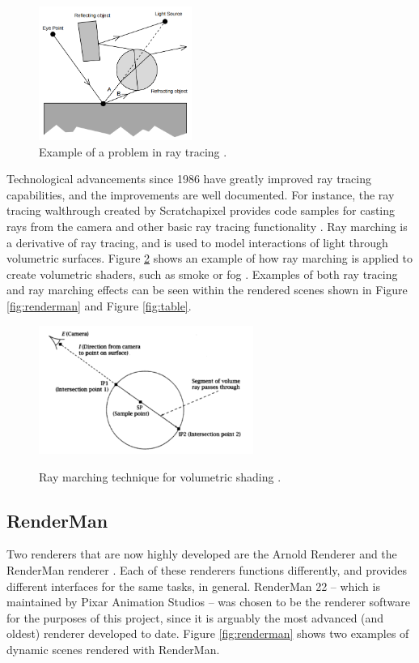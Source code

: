 \documentclass[conference]{IEEEtran}
\begin{document}
\begin{figure}[htbp]
\centerline{\includegraphics[width=5cm]{raytrace.png}}
\caption{Example of a problem in ray tracing \cite{backwards_raytrace}.}
\label{fig:raytrace}
\end{figure}

Technological advancements since 1986 have greatly improved ray tracing capabilities,
and the improvements are well documented.
For instance, the ray tracing walthrough created by Scratchapixel 
provides code samples for casting rays from the camera and other basic ray tracing
functionality \cite{raytrace_walkthrough}.
Ray marching is a derivative of ray tracing, and is used to model interactions
of light through volumetric surfaces.
Figure \ref{fig:ray_marching} shows an example of how ray marching is applied to
create volumetric shaders, such as smoke or fog \cite{ray_marching}.
Examples of both ray tracing and ray marching effects
can be seen within the rendered scenes shown in Figure \ref{fig:renderman}
and Figure \ref{fig:table}.

\begin{figure}[htbp]
\centering
{\includegraphics[width=7cm]{ray_marching.png}}
\caption{Ray marching technique for volumetric shading \cite{ray_marching}.}
\label{fig:ray_marching}
\end{figure}

\subsection{RenderMan}
Two renderers that are now highly developed are the Arnold Renderer \cite{arnold}
and the RenderMan renderer \cite{renderman_docs}. Each of these renderers
functions differently, and provides different interfaces for the same tasks, in general.
RenderMan 22 -- which is maintained by Pixar Animation Studios --
was chosen to be the renderer software for the purposes of this project,
since it is arguably the most advanced (and oldest) renderer developed to date.
Figure \ref{fig:renderman} shows two examples of dynamic scenes rendered with RenderMan.
\end{document}
